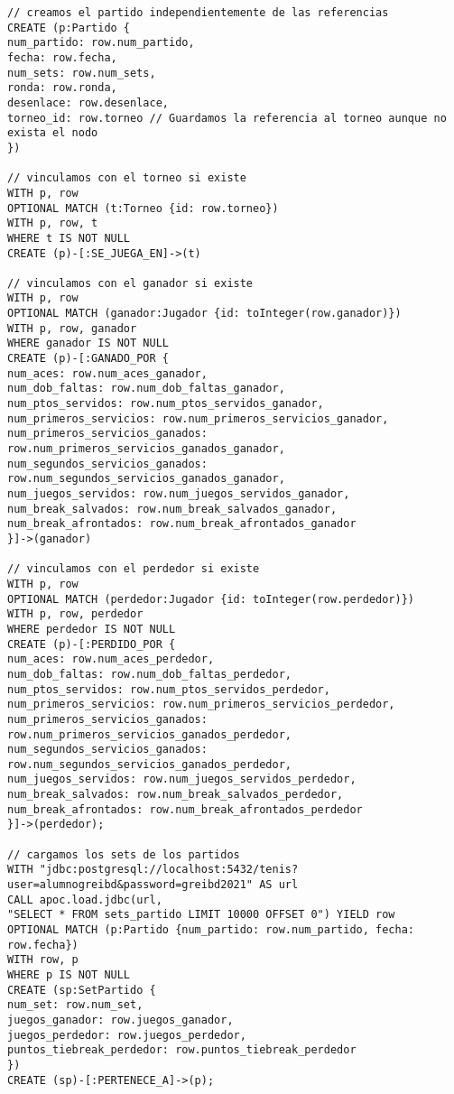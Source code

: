 \begin{lstlisting}[language=Cypher]
// creamos el partido independientemente de las referencias
CREATE (p:Partido {
num_partido: row.num_partido,
fecha: row.fecha,
num_sets: row.num_sets,
ronda: row.ronda,
desenlace: row.desenlace,
torneo_id: row.torneo // Guardamos la referencia al torneo aunque no exista el nodo
})

// vinculamos con el torneo si existe
WITH p, row
OPTIONAL MATCH (t:Torneo {id: row.torneo})
WITH p, row, t
WHERE t IS NOT NULL
CREATE (p)-[:SE_JUEGA_EN]->(t)

// vinculamos con el ganador si existe
WITH p, row
OPTIONAL MATCH (ganador:Jugador {id: toInteger(row.ganador)})
WITH p, row, ganador
WHERE ganador IS NOT NULL
CREATE (p)-[:GANADO_POR {
num_aces: row.num_aces_ganador,
num_dob_faltas: row.num_dob_faltas_ganador,
num_ptos_servidos: row.num_ptos_servidos_ganador,
num_primeros_servicios: row.num_primeros_servicios_ganador,
num_primeros_servicios_ganados: row.num_primeros_servicios_ganados_ganador,
num_segundos_servicios_ganados: row.num_segundos_servicios_ganados_ganador,
num_juegos_servidos: row.num_juegos_servidos_ganador,
num_break_salvados: row.num_break_salvados_ganador,
num_break_afrontados: row.num_break_afrontados_ganador
}]->(ganador)

// vinculamos con el perdedor si existe
WITH p, row
OPTIONAL MATCH (perdedor:Jugador {id: toInteger(row.perdedor)})
WITH p, row, perdedor
WHERE perdedor IS NOT NULL
CREATE (p)-[:PERDIDO_POR {
num_aces: row.num_aces_perdedor,
num_dob_faltas: row.num_dob_faltas_perdedor,
num_ptos_servidos: row.num_ptos_servidos_perdedor,
num_primeros_servicios: row.num_primeros_servicios_perdedor,
num_primeros_servicios_ganados: row.num_primeros_servicios_ganados_perdedor,
num_segundos_servicios_ganados: row.num_segundos_servicios_ganados_perdedor,
num_juegos_servidos: row.num_juegos_servidos_perdedor,
num_break_salvados: row.num_break_salvados_perdedor,
num_break_afrontados: row.num_break_afrontados_perdedor
}]->(perdedor);

// cargamos los sets de los partidos
WITH "jdbc:postgresql://localhost:5432/tenis?user=alumnogreibd&password=greibd2021" AS url
CALL apoc.load.jdbc(url,
"SELECT * FROM sets_partido LIMIT 10000 OFFSET 0") YIELD row
OPTIONAL MATCH (p:Partido {num_partido: row.num_partido, fecha: row.fecha})
WITH row, p
WHERE p IS NOT NULL
CREATE (sp:SetPartido {
num_set: row.num_set,
juegos_ganador: row.juegos_ganador,
juegos_perdedor: row.juegos_perdedor,
puntos_tiebreak_perdedor: row.puntos_tiebreak_perdedor
})
CREATE (sp)-[:PERTENECE_A]->(p);
\end{lstlisting}

